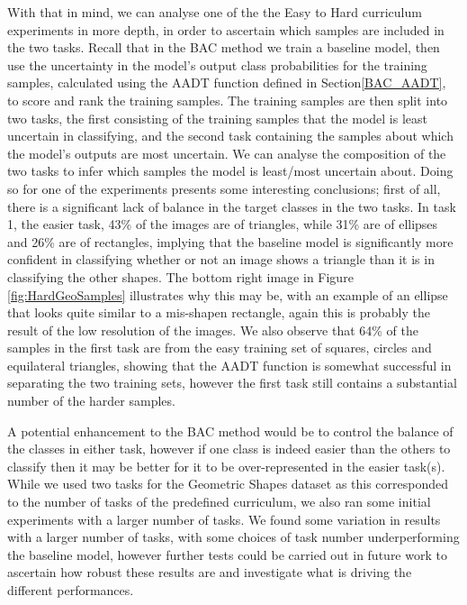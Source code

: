 With that in mind, we can analyse one of the the Easy to Hard curriculum experiments in more depth, in order to ascertain which samples are included in the two tasks. Recall that in the BAC method we train a baseline model, then use the uncertainty in the model's output class probabilities for the training samples, calculated using the AADT function defined in Section\ref{BAC_AADT}, to score and rank the training samples. The training samples are then split into two tasks, the first consisting of the training samples that the model is least uncertain in classifying, and the second task containing the samples about which the model's outputs are most uncertain. We can analyse the composition of the two tasks to infer which samples the model is least/most uncertain about. Doing so for one of the experiments presents some interesting conclusions; first of all, there is a significant lack of balance in the target classes in the two tasks. In task 1, the easier task, 43\% of the images are of triangles, while 31\% are of ellipses and 26\% are of rectangles, implying that the baseline model is significantly more confident in classifying whether or not an image shows a triangle than it is in classifying the other shapes. The bottom right image in Figure \ref{fig:HardGeoSamples} illustrates why this may be, with an example of an ellipse that looks quite similar to a mis-shapen rectangle, again this is probably the result of the low resolution of the images. We also observe that 64\% of the samples in the first task are from the easy training set of squares, circles and equilateral triangles, showing that the AADT function is somewhat successful in separating the two training sets, however the first task still contains a substantial number of the harder samples.

A potential enhancement to the BAC method would be to control the balance of the classes in either task, however if one class is indeed easier than the others to classify then it may be better for it to be over-represented in the easier task(s). While we used two tasks for the Geometric Shapes dataset as this corresponded to the number of tasks of the predefined curriculum, we also ran some initial experiments with a larger number of tasks. We found some variation in results with a larger number of tasks, with some choices of task number underperforming the baseline model, however further tests could be carried out in future work to ascertain how robust these results are and investigate what is driving the different performances.

